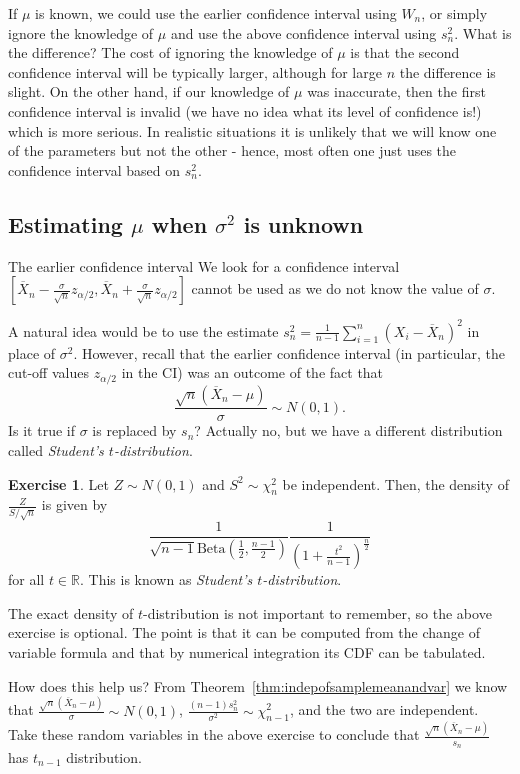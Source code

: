 \documentclass[preprint,  11pt]{amsart}
\theoremstyle{plain} %
\theoremstyle{definition} %
\newtheorem{exercise}[theorem]{Exercise}
\begin{document}
If $\mu$ is known, we could use the earlier confidence interval using $W_{n}$, or simply ignore the knowledge of $\mu$ and use the above confidence interval using $s_{n}^{2}$. What is the difference? The cost of ignoring the knowledge of $\mu$ is that the second confidence interval will be typically larger, although for large $n$ the difference is slight. On the other hand, if our knowledge of $\mu$ was inaccurate, then the first confidence interval is invalid (we have no idea what its level of confidence is!) which is more serious. In realistic situations it is unlikely that we will know one of the parameters but not the other - hence, most often one just uses the confidence interval based on $s_{n}^{2}$.


\subsection{Estimating $\mu$ when ${\sigma}^{2}$ is unknown} The earlier confidence interval We look for a confidence interval $[\overline{X}_{n}-\frac{{\sigma}}{\sqrt{n}}z_{\alpha/2},\overline{X}_{n}+\frac{{\sigma}}{\sqrt{n}}z_{\alpha/2}]$ cannot be used as we do not know the value of ${\sigma}$.

A natural idea would be to use the estimate $s_{n}^{2}=\frac{1}{n-1}\sum_{i=1}^{n}(X_{i}-\overline{X}_{n})^{2}$ in place of ${\sigma}^{2}$. However, recall that the earlier confidence interval (in particular,  the cut-off values $z_{\alpha/2}$ in the CI)  was an outcome of the fact that
$$
\frac{\sqrt{n}(\overline{X}_{n}-\mu)}{{\sigma}}\sim N(0,1).
$$
Is it true if ${\sigma}$ is replaced by $s_{n}$? Actually no, but we have a different distribution called {\em Student's $t$-distribution}.

\begin{exercise} Let $Z\sim N(0,1)$ and $S^{2}\sim \chi^{2}_{n}$ be independent. Then, the density of $\frac{Z}{S/\sqrt{n}}$ is given by 
$$
\frac{1}{\sqrt{n-1}\mbox{Beta}(\frac{1}{2},\frac{n-1}{2})}\frac{1}{\left(1+\frac{t^{2}}{n-1}\right)^{\frac{n}{2}}}
$$
for all $t\in \mathbb{R}$. This is known as {\em Student's $t$-distribution}.
\end{exercise}
The exact density of  $t$-distribution is not important to remember, so the above exercise is optional. The point is that it can be computed from the change of variable formula and that by numerical integration its CDF can be tabulated.  

How does this help us? From Theorem~\ref{thm:indepofsamplemeanandvar} we know that $\frac{\sqrt{n}(\overline{X}_{n}-\mu)}{{\sigma}}\sim N(0,1)$, $\frac{(n-1)s_{n}^{2}}{{\sigma}^{2}}\sim \chi^{2}_{n-1}$, and the two are independent. Take these random variables in the above exercise to conclude that $\frac{\sqrt{n}(\overline{X}_{n}-\mu)}{s_{n}}$ has $t_{n-1}$ distribution. 
\end{document}
